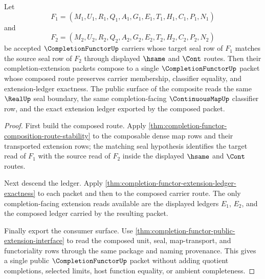 \begin{theorem}
\label{thm:completion-functor-cauchy-seal-composition}
Let
$$
F_1=(M_1,U_1,R_1,Q_1,A_1,G_1,E_1,T_1,H_1,C_1,P_1,N_1)
$$
and
$$
F_2=(M_2,U_2,R_2,Q_2,A_2,G_2,E_2,T_2,H_2,C_2,P_2,N_2)
$$
be accepted $\CompletionFunctorUp$ carriers whose target seal row of $F_1$ matches the source seal row of $F_2$ through displayed $\hsame$ and $\Cont$ routes. Then their completion-extension packets compose to a single $\CompletionFunctorUp$ packet whose composed route preserves carrier membership, classifier equality, and extension-ledger exactness. The public surface of the composite reads the same $\RealUp$ seal boundary, the same completion-facing $\ContinuousMapUp$ classifier row, and the exact extension ledger exported by the composed packet.
\end{theorem}
\begin{proof}
First build the composed route. Apply \autoref{thm:completion-functor-composition-route-stability} to the composable dense map rows and their transported extension rows; the matching seal hypothesis identifies the target read of $F_1$ with the source read of $F_2$ inside the displayed $\hsame$ and $\Cont$ routes.

Next descend the ledger. Apply \autoref{thm:completion-functor-extension-ledger-exactness} to each packet and then to the composed carrier route. The only completion-facing extension reads available are the displayed ledgers $E_1$, $E_2$, and the composed ledger carried by the resulting packet.

Finally export the consumer surface. Use \autoref{thm:completion-functor-public-extension-interface} to read the composed unit, seal, map-transport, and functoriality rows through the same package and naming provenance. This gives a single public $\CompletionFunctorUp$ packet without adding quotient completions, selected limits, host function equality, or ambient completeness.
\end{proof}

